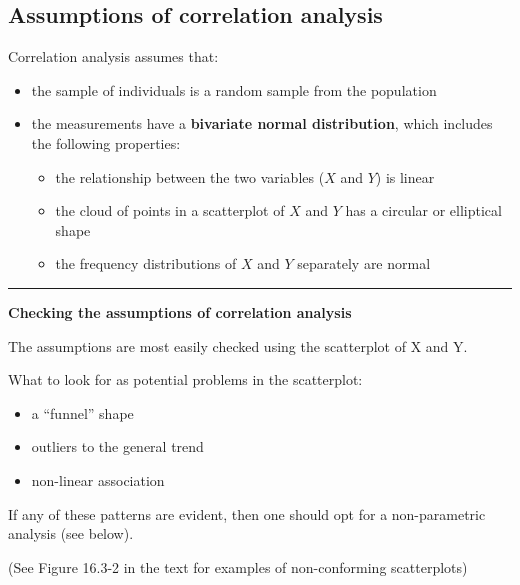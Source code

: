 \documentclass[
]{book}
\providecommand{\tightlist}{%
  \setlength{\itemsep}{0pt}\setlength{\parskip}{0pt}}
\begin{document}
\subsection{Assumptions of correlation analysis}\label{corr_assumptions}

Correlation analysis assumes that:

\begin{itemize}
\tightlist
\item
  the sample of individuals is a random sample from the population\\
\item
  the measurements have a \textbf{bivariate normal distribution}, which includes the following properties:

  \begin{itemize}
  \tightlist
  \item
    the relationship between the two variables (\(X\) and \(Y\)) is linear\\
  \item
    the cloud of points in a scatterplot of \(X\) and \(Y\) has a circular or elliptical shape\\
  \item
    the frequency distributions of \(X\) and \(Y\) separately are normal
  \end{itemize}
\end{itemize}

\begin{center}\rule{0.5\linewidth}{0.5pt}\end{center}

\textbf{Checking the assumptions of correlation analysis}

The assumptions are most easily checked using the scatterplot of X and Y.

What to look for as potential problems in the scatterplot:

\begin{itemize}
\tightlist
\item
  a ``funnel'' shape\\
\item
  outliers to the general trend\\
\item
  non-linear association
\end{itemize}

If any of these patterns are evident, then one should opt for a non-parametric analysis (see below).

(See Figure 16.3-2 in the text for examples of non-conforming scatterplots)
\end{document}
